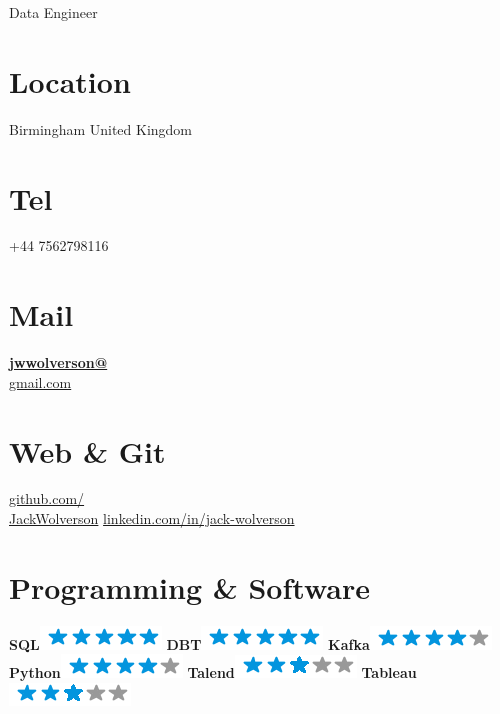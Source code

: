 \documentclass[]{friggeri-cv}
\begin{document}
      {Data Engineer}
      

\begin{aside}
  \section{Location}
    Birmingham
    United Kingdom
    ~
  \section{Tel}
    +44 7562798116
    ~
  \section{Mail}
    \href{mailto:jwwolverson@gmail.com}{\textbf{jwwolverson@}\\gmail.com}
    ~
  \section{Web \& Git}
    \href{http://github.com/JackWolverson}{github.com/\\JackWolverson}
    \href{https://www.linkedin.com/in/jack-wolverson/}{linkedin.com/in/jack-wolverson}
    ~
  \section{Programming \& Software}
    \textbf{SQL}\includegraphics[scale=0.40]{img/5stars.png}
    \textbf{DBT}\includegraphics[scale=0.40]{img/5stars.png}
    \textbf{Kafka}\includegraphics[scale=0.40]{img/4stars.png}
    \textbf{Python}\includegraphics[scale=0.40]{img/4stars.png}
    \textbf{Talend}\includegraphics[scale=0.40]{img/3stars.png}
    \textbf{Tableau}\includegraphics[scale=0.40]{img/3stars.png}
    ~

\end{aside}
\end{document}
